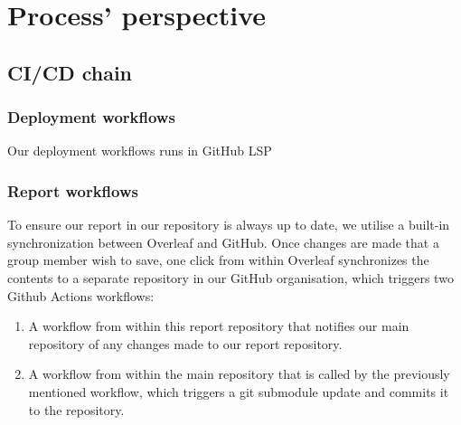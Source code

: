 \documentclass{article}
\begin{document}
\section{Process' perspective}


\subsection{CI/CD chain}

\subsubsection{Deployment workflows}
Our deployment workflows runs in GitHub LSP

\subsubsection{Report workflows}
To ensure our report in our repository is always up to date, we utilise a built-in synchronization between Overleaf and GitHub. Once changes are made that a group member wish to save, one click from within Overleaf synchronizes the contents to a separate repository in our GitHub organisation, which triggers two Github Actions workflows:
\begin{enumerate}
    \item A workflow from within this report repository that notifies our main repository of any changes made to our report repository.
    \item A workflow from within the main repository that is called by the previously mentioned workflow, which triggers a git submodule update and commits it to the repository.
\end{enumerate}
\end{document}
